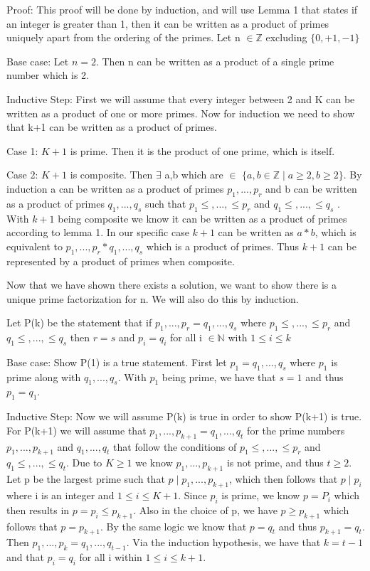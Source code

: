 \documentclass{article}
\begin{document}
Proof: This proof will be done by induction, and will use Lemma 1 that states if an integer is greater than 1, then it can be written as a product of primes uniquely apart from the ordering of the primes. Let n $\in \mathbb{Z}$ excluding $\{0,+1,-1\}$
\begin{adjustwidth}{1cm}{}
Base case: Let $n = 2$. Then n can be written as a product of a single prime number which is 2. 

Inductive Step: First we will assume that every integer between 2 and K can be written as a product of one or more primes. Now for induction we need to show that k+1 can be written as a product of primes. 

Case 1: $K+1$ is prime. Then it is the product of one prime, which is itself.

Case 2: $K+1$ is composite. Then $\exists$ a,b which are $\in$ $\{ a,b \in \mathbb{Z} \mid a \geq 2, b \geq 2\}$. By induction a can be written as a product of primes $p_1,..., p_r$ and b can be written as a product of primes $q_1, ..., q_s$ such that $p_1 \leq , ..., \leq p_r$ and $q_1 \leq , ..., \leq q_s$ . With $k+1$ being composite we know it can be written as a product of primes according to lemma 1. In our specific case $k+1$ can be written as $a*b$, which is equivalent to $p_1,...,p_r * q_1,..., q_s$ which is a product of primes. Thus $k+1$ can be represented by a product of primes when composite. 
\end{adjustwidth}
Now that we have shown there exists a solution, we want to show there is a unique prime factorization for n. We will also do this by induction. 
\begin{adjustwidth}{1cm}{}
Let P(k) be the statement that if $p_1,..., p_r = q_1, ..., q_s$ where $p_1 \leq , ..., \leq p_r$ and $q_1 \leq , ..., \leq q_s$ then $r=s$ and $p_i = q_i$ for all i $\in \mathbb{N}$ with $1 \leq i \leq k$

Base case: Show P(1) is a true statement. First let $p_1 = q_1,...,q_s$ where $p_1$ is prime along with $q_1,...,q_s$. With $p_1$ being prime, we have that $s=1$ and thus $p_1 = q_1$.  

Inductive Step: Now we will assume P(k) is true in order to show P(k+1) is true. For P(k+1) we will assume that $p_1,..., p_{k+1} = q_1, ..., q_t$ for the prime numbers $p_1,..., p_{k+1}$ and $q_1, ..., q_t$ that follow the conditions of $p_1 \leq , ..., \leq p_r$ and $q_1 \leq , ..., \leq q_t$. Due to $K \geq 1$ we know $p_1,..., p_{k+1}$ is not prime, and thus $t \geq 2$. Let p be the largest prime such that $p \mid p_1,..., p_{k+1}$, which then follows that $p \mid p_i$ where i is an integer and $1 \leq i \leq K+1$. Since $p_i$ is prime, we know $p = P_i$  which then results in $p = p_i \leq p_{k+1}$. Also in the choice of p, we have $p \geq p_{k+1}$ which follows that $p=p_{k+1}$. By the same logic we know that $ p = q_t$ and thus $ p_{k+1} = q_t$. Then $p_1,..., p_k = q_1, ..., q_{t-1}$. Via the induction hypothesis, we have that $k = t-1$ and that $p_i = q_i$ for all i within $1 \leq i \leq k+1$.

\end{adjustwidth}
\end{document}
